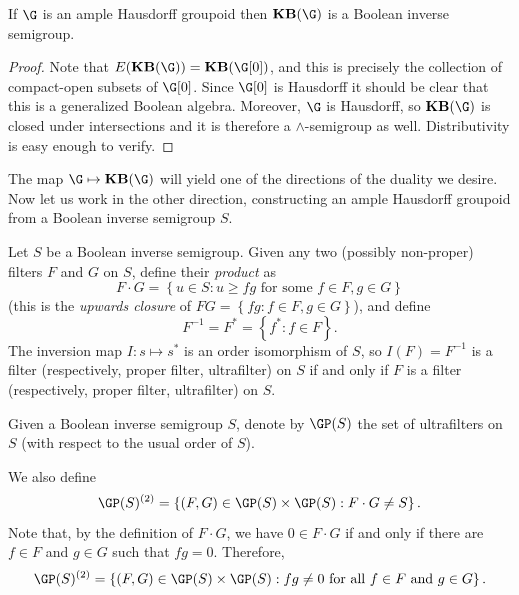 \begin{proposition}[{\cite[Proposition 2.18(8)]{MR2827424}}]
If $\G$ is an ample Hausdorff groupoid then $\mathbf{KB}(\G)$ is a Boolean inverse semigroup.
\end{proposition}
\begin{proof}
Note that $E(\mathbf{KB}(\G))=\mathbf{KB}(\G[0])$, and this is precisely the collection of compact-open subsets of $\G[0]$. Since $\G[0]$ is Hausdorff it should be clear that this is a generalized Boolean algebra. Moreover, $\G$ is Hausdorff, so $\mathbf{KB}(\G)$ is closed under intersections and it is therefore a $\wedge$-semigroup as well. Distributivity is easy enough to verify.\qedhere
\end{proof}

The map $\G\mapsto\mathbf{KB}(\G)$ will yield one of the directions of the duality we desire. Now let us work in the other direction, constructing an ample Hausdorff groupoid from a Boolean inverse semigroup $S$.

Let $S$ be a Boolean inverse semigroup. Given any two (possibly non-proper) filters $F$ and $G$ on $S$, define their \emph{product} as
\[F\cdot G=\left\{u\in S:u\geq fg\text{ for some }f\in F,g\in G\right\}\]
(this is the \emph{upwards closure} of $FG=\left\{fg:f\in F, g\in G\right\}$), and define
\[F^{-1}=F^*=\left\{f^*:f\in F\right\}.\]
The inversion map $I:s\mapsto s^*$ is an order isomorphism of $S$, so $I(F)=F^{-1}$ is a filter (respectively, proper filter, ultrafilter) on $S$ if and only if $F$ is a filter (respectively, proper filter, ultrafilter) on $S$.

\begin{definition}
Given a Boolean inverse semigroup $S$, denote by $\GP(S)$ the set of ultrafilters on $S$ (with respect to the usual order of $S$).
\end{definition}

We also define
\[\GP(S)^{(2)}=\left\{(F,G)\in\GP(S)\times\GP(S):F\cdot G\neq S\right\}.\]
Note that, by the definition of $F\cdot G$, we have $0\in F\cdot G$ if and only if there are $f\in F$ and $g\in G$ such that $fg=0$. Therefore,
\[\GP(S)^{(2)}=\left\{(F,G)\in\GP(S)\times\GP(S):fg\neq 0\text{ for all }f\in F\text{ and }g\in G\right\}.\]

